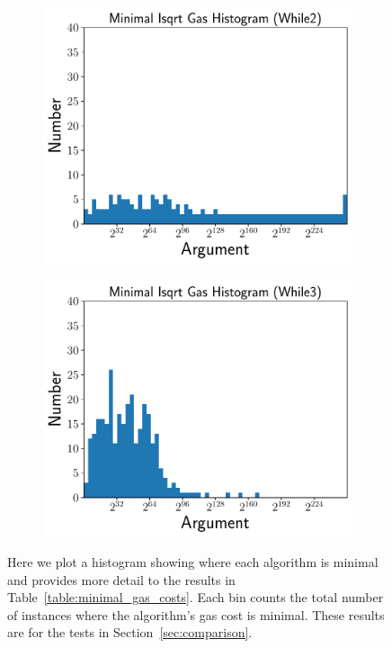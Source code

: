 \begin{figure}[p]
    \begin{subfigure}[t]{0.45\textwidth}
    \includegraphics[width=\textwidth]{plots/minimal_hist_While2.pdf}
    \end{subfigure}
    \begin{subfigure}[t]{0.45\textwidth}
    \includegraphics[width=\textwidth]{plots/minimal_hist_While3.pdf}
    \end{subfigure}
    \caption{Here we plot a histogram showing where each algorithm is minimal
        and provides more detail to the results
        in Table~\ref{table:minimal_gas_costs}.
        Each bin counts the total number of instances where the algorithm's
        gas cost is minimal.
        These results are for the tests in Section~\ref{sec:comparison}.
        }
    \label{fig:minimal_gas_hist}
\end{figure}

